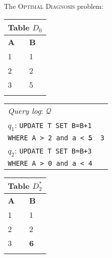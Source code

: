 \begin{figure}[t]
The \textsc{Optimal Diagnosis} problem:\\
    \begin{minipage}[t]{0.1\textwidth}
         \vspace{0pt} 
         \centering
        \begin{tabular}{ll}
            \multicolumn{2}{l}{Table $D_0$}\\
            \toprule
            \textbf{A}  & \textbf{B}\\
            \midrule
			 1 & 1 \\
			 2 & 2 \\
			 3 & 5 \\
            \bottomrule
            \\
        \end{tabular}
    \end{minipage}
    \begin{minipage}[t]{0.2\textwidth}
         \vspace{0pt} 
         \centering
        \begin{tabular}{p{26ex}}
            \multicolumn{1}{l}{\emph{Query log}: $\mathcal{Q}$}\\
            $q_1$: \texttt{\small UPDATE T SET B=B+1}\\
            \texttt{\small WHERE A > 2 and a < \sout{5} {\color{red} 3}} \\
            $q_2$: \texttt{\small UPDATE T SET B=B+3}\\
                  \texttt{\small WHERE A > 0 and a < 4} \\
        \end{tabular}
    \end{minipage}
    \begin{minipage}[t]{0.16\textwidth}
         \vspace{0pt} 
         \centering
        \begin{tabular}{ll}
            \multicolumn{2}{l}{Table $D_2^*$}\\
            \toprule
            \textbf{A}  & \textbf{B}\\
            \midrule
			 1 & 1 \\
			 2 & 2 \\
			 3 & {\textbf{6}} \\
            \bottomrule
            \\
        \end{tabular}
    \end{minipage}

\end{figure}

